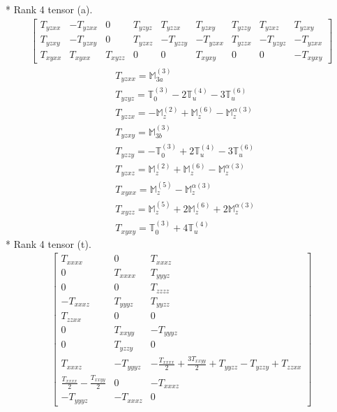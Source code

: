 \documentclass[fleqn,8pt,landscape]{jsarticle}
\begin{document}
* Rank 4 tensor (a).
\begin{align*}
\begin{bmatrix} T_{yzxx} & - T_{yzxx} & 0 & T_{yzyz} & T_{yzzx} & T_{yzxy} & T_{yzzy} & T_{yzxz} & T_{yzxy} \\ T_{yzxy} & - T_{yzxy} & 0 & T_{yzxz} & - T_{yzzy} & - T_{yzxx} & T_{yzzx} & - T_{yzyz} & - T_{yzxx} \\ T_{xyxx} & T_{xyxx} & T_{xyzz} & 0 & 0 & T_{xyxy} & 0 & 0 & - T_{xyxy} \end{bmatrix}
\end{align*}
\begin{align*}
& T_{yzxx} = \mathbb{M}_{3a}^{(3)} \\
& T_{yzyz} = \mathbb{T}_{0}^{(3)} - 2 \mathbb{T}_{u}^{(4)} - 3 \mathbb{T}_{u}^{(6)} \\
& T_{yzzx} = - \mathbb{M}_{z}^{(2)} + \mathbb{M}_{z}^{(6)} - \mathbb{M}_{z}^{\alpha(3)} \\
& T_{yzxy} = \mathbb{M}_{3b}^{(3)} \\
& T_{yzzy} = - \mathbb{T}_{0}^{(3)} + 2 \mathbb{T}_{u}^{(4)} - 3 \mathbb{T}_{u}^{(6)} \\
& T_{yzxz} = \mathbb{M}_{z}^{(2)} + \mathbb{M}_{z}^{(6)} - \mathbb{M}_{z}^{\alpha(3)} \\
& T_{xyxx} = \mathbb{M}_{z}^{(5)} - \mathbb{M}_{z}^{\alpha(3)} \\
& T_{xyzz} = \mathbb{M}_{z}^{(5)} + 2 \mathbb{M}_{z}^{(6)} + 2 \mathbb{M}_{z}^{\alpha(3)} \\
& T_{xyxy} = \mathbb{T}_{0}^{(3)} + 4 \mathbb{T}_{u}^{(4)}
\end{align*}
* Rank 4 tensor (t).
\begin{align*}
\begin{bmatrix} T_{xxxx} & 0 & T_{xxxz} \\ 0 & T_{xxxx} & T_{yyyz} \\ 0 & 0 & T_{zzzz} \\ - T_{xxxz} & T_{yyyz} & T_{yyzz} \\ T_{zzxx} & 0 & 0 \\ 0 & T_{xxyy} & - T_{yyyz} \\ 0 & T_{yzzy} & 0 \\ T_{xxxz} & - T_{yyyz} & - \frac{T_{xxxx}}{2} + \frac{3 T_{xxyy}}{2} + T_{yyzz} - T_{yzzy} + T_{zzxx} \\ \frac{T_{xxxx}}{2} - \frac{T_{xxyy}}{2} & 0 & - T_{xxxz} \\ - T_{yyyz} & - T_{xxxz} & 0 \end{bmatrix}
\end{align*}
\end{document}
